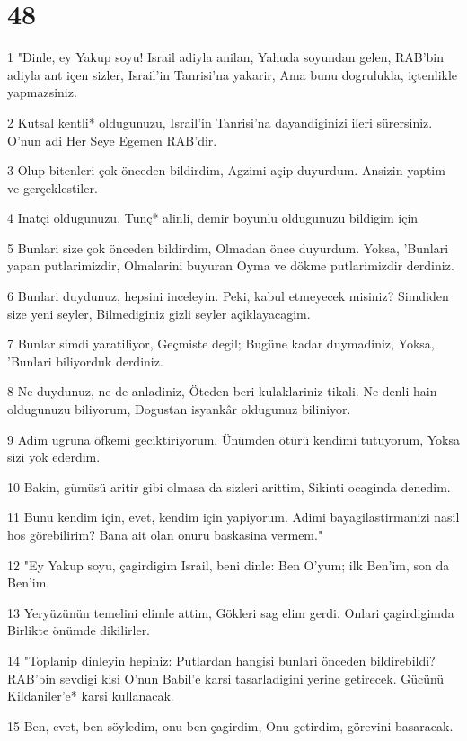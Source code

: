 \chapter{48}

\par 1 "Dinle, ey Yakup soyu! Israil adiyla anilan, Yahuda soyundan gelen, RAB'bin adiyla ant içen sizler, Israil'in Tanrisi'na yakarir, Ama bunu dogrulukla, içtenlikle yapmazsiniz.
\par 2 Kutsal kentli* oldugunuzu, Israil'in Tanrisi'na dayandiginizi ileri sürersiniz. O'nun adi Her Seye Egemen RAB'dir.
\par 3 Olup bitenleri çok önceden bildirdim, Agzimi açip duyurdum. Ansizin yaptim ve gerçeklestiler.
\par 4 Inatçi oldugunuzu, Tunç* alinli, demir boyunlu oldugunuzu bildigim için
\par 5 Bunlari size çok önceden bildirdim, Olmadan önce duyurdum. Yoksa, 'Bunlari yapan putlarimizdir, Olmalarini buyuran Oyma ve dökme putlarimizdir derdiniz.
\par 6 Bunlari duydunuz, hepsini inceleyin. Peki, kabul etmeyecek misiniz? Simdiden size yeni seyler, Bilmediginiz gizli seyler açiklayacagim.
\par 7 Bunlar simdi yaratiliyor, Geçmiste degil; Bugüne kadar duymadiniz, Yoksa, 'Bunlari biliyorduk derdiniz.
\par 8 Ne duydunuz, ne de anladiniz, Öteden beri kulaklariniz tikali. Ne denli hain oldugunuzu biliyorum, Dogustan isyankâr oldugunuz biliniyor.
\par 9 Adim ugruna öfkemi geciktiriyorum. Ünümden ötürü kendimi tutuyorum, Yoksa sizi yok ederdim.
\par 10 Bakin, gümüsü aritir gibi olmasa da sizleri arittim, Sikinti ocaginda denedim.
\par 11 Bunu kendim için, evet, kendim için yapiyorum. Adimi bayagilastirmanizi nasil hos görebilirim? Bana ait olan onuru baskasina vermem."
\par 12 "Ey Yakup soyu, çagirdigim Israil, beni dinle: Ben O'yum; ilk Ben'im, son da Ben'im.
\par 13 Yeryüzünün temelini elimle attim, Gökleri sag elim gerdi. Onlari çagirdigimda Birlikte önümde dikilirler.
\par 14 "Toplanip dinleyin hepiniz: Putlardan hangisi bunlari önceden bildirebildi? RAB'bin sevdigi kisi O'nun Babil'e karsi tasarladigini yerine getirecek. Gücünü Kildaniler'e* karsi kullanacak.
\par 15 Ben, evet, ben söyledim, onu ben çagirdim, Onu getirdim, görevini basaracak.
